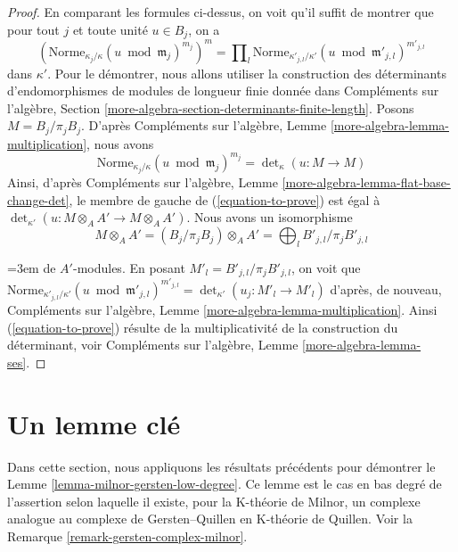 \begin{proof}
\medskip\noindent
En comparant les formules ci-dessus, on voit qu'il suffit de montrer que
pour tout $j$ et toute unité $u \in B_j$, on a
\begin{equation}
\label{equation-to-prove}
\left(\text{Norme}_{\kappa_j/\kappa}(u \bmod \mathfrak m_j)^{m_j}\right)^m
=
\prod\nolimits_l
\text{Norme}_{\kappa'_{j, l}/\kappa'}(u \bmod \mathfrak m'_{j, l})^{m'_{j, l}}
\end{equation}
dans $\kappa'$. Pour le démontrer, nous allons utiliser la construction des déterminants
d'endomorphismes de modules de longueur finie donnée dans
Compléments sur l'algèbre, Section \ref{more-algebra-section-determinants-finite-length}.
Posons $M = B_j/\pi_j B_j$. D'après
Compléments sur l'algèbre, Lemme \ref{more-algebra-lemma-multiplication}, nous avons
$$
\text{Norme}_{\kappa_j/\kappa}(u \bmod \mathfrak m_j)^{m_j} =
\det\nolimits_\kappa(u : M \to M)
$$
Ainsi, d'après
Compléments sur l'algèbre, Lemme \ref{more-algebra-lemma-flat-base-change-det},
le membre de gauche de (\ref{equation-to-prove}) est égal à
$\det_{\kappa'}(u : M \otimes_A A' \to M \otimes_A A')$.
Nous avons un isomorphisme
$$
M \otimes_A A' = (B_j/\pi_j B_j) \otimes_A A' =
\bigoplus\nolimits_l B'_{j, l}/\pi_j B'_{j, l}
$$
{\emergencystretch=3em de $A'$-modules. En posant $M'_l = B'_{j, l}/\pi_j B'_{j, l}$, on voit que
$\text{Norme}_{\kappa'_{j, l}/\kappa'}(u \bmod \mathfrak m'_{j, l})^{m'_{j, l}}
= \det_{\kappa'}(u_j : M'_l \to M'_l)$ d'après, de nouveau,
Compléments sur l'algèbre, Lemme \ref{more-algebra-lemma-multiplication}.
Ainsi (\ref{equation-to-prove}) résulte de la multiplicativité de la construction
du déterminant, voir Compléments sur l'algèbre, Lemme \ref{more-algebra-lemma-ses}.\par}
\end{proof}






\section{Un lemme clé}
\label{section-key-lemma}

\noindent
Dans cette section, nous appliquons les résultats précédents pour démontrer le
Lemme \ref{lemma-milnor-gersten-low-degree}.
Ce lemme est le cas en bas degré de l'assertion selon laquelle
il existe, pour la K-théorie de Milnor, un complexe analogue
au complexe de Gersten--Quillen en K-théorie de Quillen.
Voir la Remarque \ref{remark-gersten-complex-milnor}.

